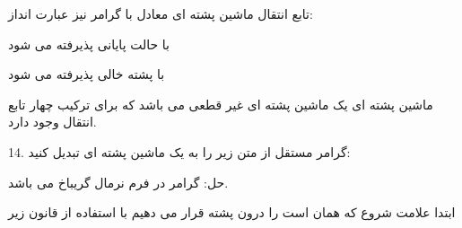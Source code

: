 \documentclass[]{article}
\begin{document}
تابع انتقال ماشین پشته ای معادل با گرامر نیز عبارت انداز:

\begin{center}
\end{center}
\begin{center}
\end{center}
\begin{center}
\end{center}
\begin{center}
\end{center}
\begin{center}
\end{center}
\begin{center}
\end{center}
\begin{center}
\end{center}

با حالت پایانی پذیرفته می شود

\begin{center}
\end{center}
با پشته خالی پذیرفته می شود

ماشین پشته ای یک ماشین پشته ای غیر قطعی می باشد که برای ترکیب چهار تابع انتقال وجود دارد.



14. گرامر مستقل از متن زیر را به یک ماشین پشته ای تبدیل کنید:

\begin{center}
\end{center}
\begin{center}
\end{center}

حل: گرامر در فرم نرمال گریباخ می باشد.

ابتدا علامت شروع که همان  است را درون پشته قرار می دهیم با استفاده از قانون زیر
\end{document}
